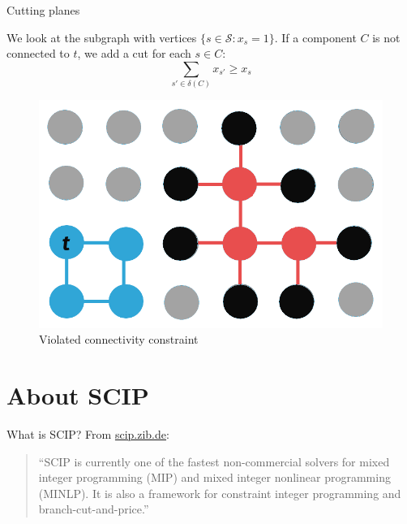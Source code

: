 \documentclass[fleqn]{beamer}
\newcommand{\superpixels}{\mathcal{S}}
\begin{document}
	\begin{frame}{Cutting planes}
		
        
		We look at the subgraph with vertices $\{s\in\superpixels:x_s=1\}$.
        If a component $C$ is not connected to $t$,
        we add a cut for each $s\in C$:
        \[\sum_{s'\in\delta(C)}x_{s'} \geq x_s\]
        
        \begin{figure}
            \centering
            \includegraphics[scale=.2]{cuttingplanes.png}
            \caption{Violated connectivity constraint}
        \end{figure}
	\end{frame}
	
	\section{About SCIP}
	\begin{frame}{What is SCIP?}
		From \url{scip.zib.de}:
		\begin{quote}
			``SCIP is currently one of the fastest non-commercial solvers for mixed integer programming (MIP)
			and mixed integer nonlinear programming (MINLP).
			It is also a framework for constraint integer programming and branch-cut-and-price.''
		\end{quote}
	\end{frame}
\end{document}
